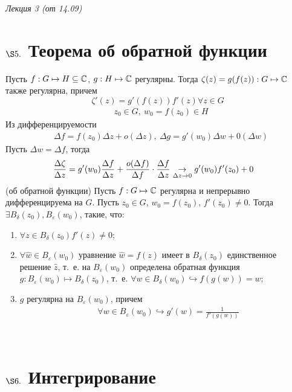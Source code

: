 \begin{flushright}
    \textit{Лекция 3 (от 14.09)}
\end{flushright}
\section{$\S 5.$ Теорема об обратной функции}
\theorem
Пусть $f: G \mapsto H \subseteq \mathbb{C}$, $g: H \mapsto \mathbb{C}$ регулярны.
Тогда $\zeta(z) = g(f(z)): G \mapsto \mathbb{C}$ также регулярна, причем
\begin{equation}\label{(3.1)}
    \zeta'(z) = g'(f(z))f'(z) \forall z \in G
\end{equation}
\pr
\begin{align*}
  & z_0 \in G, \ w_0 = f(z_0) \in H
\end{align*}
Из дифференцируемости
\begin{align*}
  & \Delta f = f(z_0)\Delta z + o(\Delta z), \ \Delta g = g'(w_0) \Delta w + 0(\Delta w)
\end{align*}
Пусть $\Delta w = \Delta f$, тогда
\begin{align*}
  & \frac{\Delta \zeta}{\Delta z} = g'(w_0) \frac{\Delta f}{\Delta z} + \frac{o(\Delta f)}{\Delta f} \cdot \frac{\Delta f}{\Delta z} \underset{\Delta z \to 0}{\to} g'(w_0)f'(z_0) + 0
\end{align*}
\theorem (об обратной функции)
Пусть $f: G \mapsto \mathbb{C}$ регулярна и непрерывно дифференцируема на $G$. Пусть
$z_0 \in G$, $w_0 = f(z_0)$, $f'(z_0) \neq 0$. Тогда $\exists B_\delta(z_0),
B_\varepsilon(w_0)$, такие, что:
\begin{enumerate}
    \item $\forall z \in B_\delta(z_0) f'(z) \neq 0$;
    \item $\forall \hat{w} \in B_\varepsilon(w_0)$ уравнение $\hat{w} = f(z)$
    имеет в $B_\delta(z_0)$ единственное решение $\hat{z}$, т.~е. на
    $B_\varepsilon(w_0)$ определена обратная функция $g: B_\varepsilon(w_0)
    \mapsto B_\delta(z_0)$, т.~е. $\forall w \in B_\delta(w_0) \hookrightarrow
    f(g(w)) = w$;
    \item $g$ регулярна на $B_\varepsilon(w_0)$, причем
    \begin{align*}
      & \forall w \in B_\varepsilon(w_0) \hookrightarrow g'(w) = \frac{1}{f'(g(w))}
    \end{align*}
\end{enumerate}
\pr
~
\section{$\S 6.$ Интегрирование}